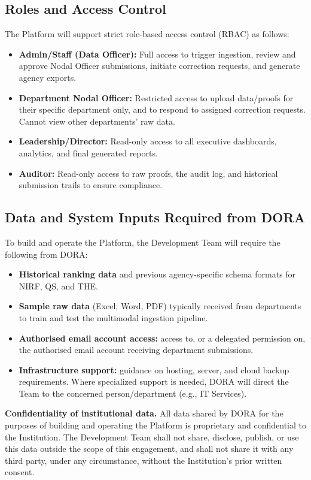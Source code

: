 \documentclass[11pt]{article}
\begin{document}
\subsection{Roles and Access Control}
\label{sec:roles}
The Platform will support strict role-based access control (RBAC) as follows:
\begin{itemize}[leftmargin=1.4em, itemsep=3pt]
\item \textbf{Admin/Staff (Data Officer):} Full access to trigger ingestion, review and approve Nodal Officer submissions, initiate correction requests, and generate agency exports.
\item \textbf{Department Nodal Officer:} Restricted access to upload data/proofs for their specific department only, and to respond to assigned correction requests. Cannot view other departments' raw data.
\item \textbf{Leadership/Director:} Read-only access to all executive dashboards, analytics, and final generated reports.
\item \textbf{Auditor:} Read-only access to raw proofs, the audit log, and historical submission trails to ensure compliance.
\end{itemize}

\subsection{Data and System Inputs Required from DORA}
To build and operate the Platform, the Development Team will require the following from DORA:
\begin{itemize}[leftmargin=1.4em, itemsep=3pt]
\item \textbf{Historical ranking data} and previous agency-specific schema formats for NIRF, QS, and THE.
\item \textbf{Sample raw data} (Excel, Word, PDF) typically received from departments to train and test the multimodal ingestion pipeline.
\item \textbf{Authorised email account access:} access to, or a delegated permission on, the authorised email account receiving department submissions.
\item \textbf{Infrastructure support:} guidance on hosting, server, and cloud backup requirements. Where specialized support is needed, DORA will direct the Team to the concerned person/department (e.g., IT Services).
\end{itemize}

\textbf{Confidentiality of institutional data.} All data shared by DORA for the purposes of building and operating the Platform is proprietary and confidential to the Institution. The Development Team shall not share, disclose, publish, or use this data outside the scope of this engagement, and shall not share it with any third party, under any circumstance, without the Institution's prior written consent.
\end{document}
